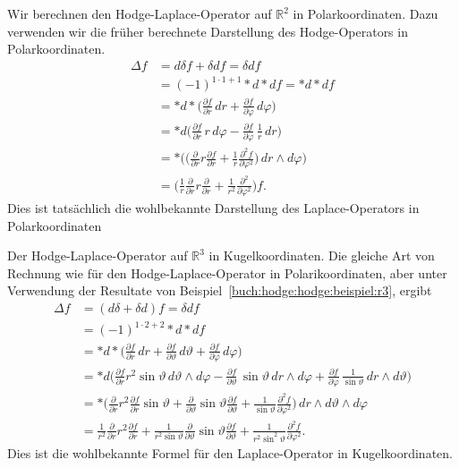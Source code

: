 \begin{beispiel}
Wir berechnen den Hodge-Laplace-Operator auf $\mathbb{R}^2$ in
Polarkoordinaten.
%
Dazu verwenden wir die früher berechnete Darstellung des Hodge-Operators
in Polarkoordinaten.
\begin{align*}
\Delta f
&=
d\delta f
+
\delta d f
=
\delta d f
\\
&=
(-1)^{1\cdot 1+1}
{\ast}d{\ast}d f
=
{\ast}d{\ast}d f
\\
&=
{\ast}d{\ast}
\biggl(
\frac{\partial f}{\partial r}\,dr
+
\frac{\partial f}{\partial \varphi}\,d\varphi
\biggr)
\\
&=
{\ast}d\biggl(
\frac{\partial f}{\partial r}\,r\,d\varphi
-
\frac{\partial f}{\partial \varphi}\,\frac{1}{r}\,dr
\biggr)
\\
&=
{\ast}
\biggl(
\biggl(
\frac{\partial }{\partial r} r \frac{\partial f}{\partial r}
+
\frac{1}{r}
\frac{\partial^2 f}{\partial\varphi^2}
\biggr)
\,dr\wedge d\varphi
\biggr)
\\
&=
\biggl(
\frac{1}{r}
\frac{\partial}{\partial r} 
r
\frac{\partial}{\partial r}
+
\frac{1}{r^2}
\frac{\partial^2}{\partial \varphi^2}
\biggr)
f.
\end{align*}
Dies ist tatsächlich die wohlbekannte Darstellung des
Laplace-Operators in Polarkoordinaten
\end{beispiel}

\begin{beispiel}
Der Hodge-Laplace-Operator auf $\mathbb{R}^3$ in
Kugelkoordinaten.
%
Die gleiche Art von Rechnung wie für den Hodge-Laplace-Operator in
Polarikoordinaten, aber unter Verwendung der Resultate von
Beispiel~\ref{buch:hodge:hodge:beispiel:r3}, ergibt 
\begin{align*}
\Delta f
&=
(d\delta + \delta d) f
=
\delta d f
\\
&=
(-1)^{1\cdot 2+2}
{\ast}d{\ast}df
\\
&=
{\ast}d{\ast}\biggl(
\frac{\partial f}{\partial r}\,dr
+
\frac{\partial f}{\partial\vartheta}\,d\vartheta
+
\frac{\partial f}{\partial\varphi}\,d\varphi
\biggr)
\\
&=
{\ast}d\biggl(
\frac{\partial f}{\partial r} r^2\sin\vartheta \, d\vartheta\wedge d\varphi
-
\frac{\partial f}{\partial\vartheta}\,\sin\vartheta\,dr\wedge d\varphi
+
\frac{\partial f}{\partial\varphi}\,\frac{1}{\sin\vartheta}\,dr\wedge d\vartheta
\biggr)
\\
&=
{\ast}
\biggl(
\frac{\partial}{\partial r}r^2\frac{\partial f}{\partial r}
\sin\vartheta
+
\frac{\partial}{\partial \vartheta}
\sin\vartheta
\frac{\partial f}{\partial \vartheta}
+
\frac{1}{\sin\vartheta}
\frac{\partial^2 f}{\partial\varphi^2}
\biggr)
\,dr\wedge d\vartheta\wedge d\varphi
\\
&=
\frac{1}{r^2}
\frac{\partial}{\partial r}r^2\frac{\partial f}{\partial r}
+
\frac{1}{r^2\sin\vartheta}
\frac{\partial}{\partial \vartheta}
\sin\vartheta
\frac{\partial f}{\partial \vartheta}
+
\frac{1}{r^2\sin^2\vartheta}
\frac{\partial^2 f}{\partial \varphi^2}.
\end{align*}
Dies ist die wohlbekannte Formel für den Laplace-Operator in 
Kugelkoordinaten.
\end{beispiel}


